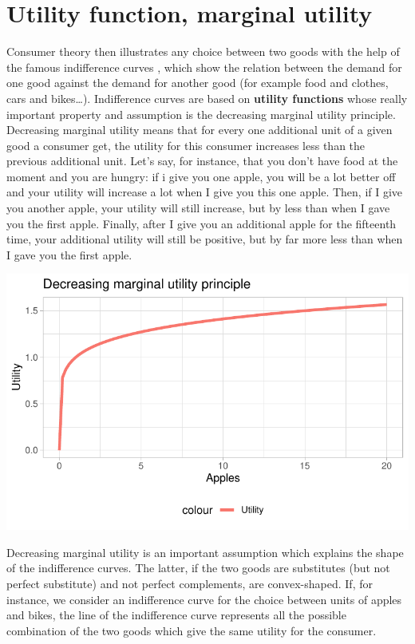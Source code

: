 \documentclass[
  letterpaper,
  DIV=11,
  numbers=noendperiod]{scrreprt}
\begin{document}
\hypertarget{utility-function-marginal-utility}{%
\section{Utility function, marginal
utility}\label{utility-function-marginal-utility}}

Consumer theory then illustrates any choice between two goods with the
help of the famous indifference curves , which show the relation between
the demand for one good against the demand for another good (for example
food and clothes, cars and bikes\ldots). Indifference curves are based
on \textbf{utility functions} whose really important property and
assumption is the decreasing marginal utility principle. Decreasing
marginal utility means that for every one additional unit of a given
good a consumer get, the utility for this consumer increases less than
the previous additional unit. Let's say, for instance, that you don't
have food at the moment and you are hungry: if i give you one apple, you
will be a lot better off and your utility will increase a lot when I
give you this one apple. Then, if I give you another apple, your utility
will still increase, but by less than when I gave you the first apple.
Finally, after I give you an additional apple for the fifteenth time,
your additional utility will still be positive, but by far more less
than when I gave you the first apple.

\includegraphics{consumer-theory_files/figure-pdf/unnamed-chunk-3-1.pdf}

Decreasing marginal utility is an important assumption which explains
the shape of the indifference curves. The latter, if the two goods are
substitutes (but not perfect substitute) and not perfect complements,
are convex-shaped. If, for instance, we consider an indifference curve
for the choice between units of apples and bikes, the line of the
indifference curve represents all the possible combination of the two
goods which give the same utility for the consumer.
\end{document}
